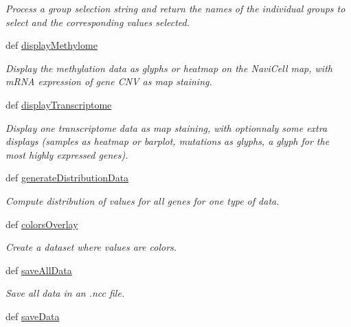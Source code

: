 \begin{DoxyCompactItemize}
\begin{DoxyCompactList}\small\item\em Process a group selection string and return the names of the individual groups to select and the corresponding values selected. \item\end{DoxyCompactList}\item 
def \hyperlink{classnavicom_1_1navicom_1_1NaviCom_a018f936de625af8a5dd7e8250ede6483}{displayMethylome}
\begin{DoxyCompactList}\small\item\em Display the methylation data as glyphs or heatmap on the NaviCell map, with mRNA expression of gene CNV as map staining. \item\end{DoxyCompactList}\item 
def \hyperlink{classnavicom_1_1navicom_1_1NaviCom_a001dadf6f3dc0c77ba5b14da621b110d}{displayTranscriptome}
\begin{DoxyCompactList}\small\item\em Display one transcriptome data as map staining, with optionnaly some extra displays (samples as heatmap or barplot, mutations as glyphs, a glyph for the most highly expressed genes). \item\end{DoxyCompactList}\item 
def \hyperlink{classnavicom_1_1navicom_1_1NaviCom_a8d417589ac7fb5ab3c26ccd025938504}{generateDistributionData}
\begin{DoxyCompactList}\small\item\em Compute distribution of values for all genes for one type of data. \item\end{DoxyCompactList}\item 
def \hyperlink{classnavicom_1_1navicom_1_1NaviCom_a66a4bf5d38161f7ca29f030037b3565b}{colorsOverlay}
\begin{DoxyCompactList}\small\item\em Create a dataset where values are colors. \item\end{DoxyCompactList}\item 
def \hyperlink{classnavicom_1_1navicom_1_1NaviCom_ab539e16bff0a424ebd2753c153ff4e53}{saveAllData}
\begin{DoxyCompactList}\small\item\em Save all data in an .ncc file. \item\end{DoxyCompactList}\item 
\hypertarget{classnavicom_1_1navicom_1_1NaviCom_ac53d9dc53ca0af44586a55fb1bffe8bd}{
def \hyperlink{classnavicom_1_1navicom_1_1NaviCom_ac53d9dc53ca0af44586a55fb1bffe8bd}{saveData}}
\label{classnavicom_1_1navicom_1_1NaviCom_ac53d9dc53ca0af44586a55fb1bffe8bd}


\end{DoxyCompactItemize}
